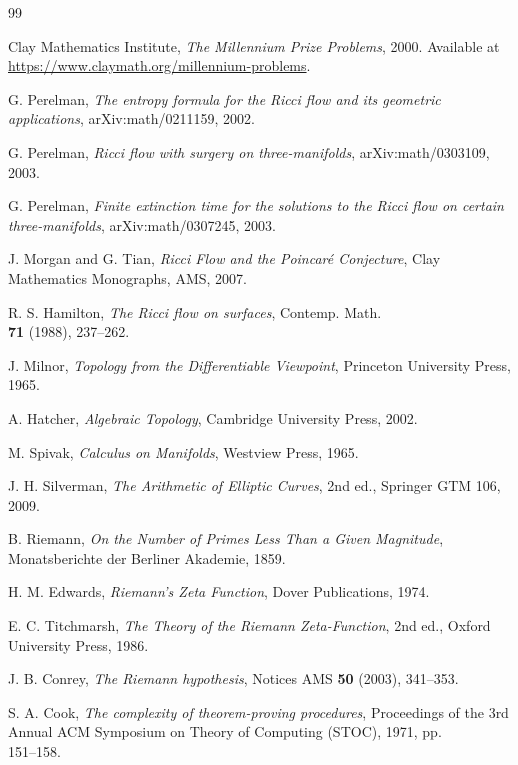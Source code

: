 \documentclass[11pt,a4paper]{book}
\theoremstyle{definition}
\begin{document}
\begin{thebibliography}{99}

 Clay Mathematics Institute, \textit{The Millennium Prize Problems}, 2000. Available at \url{https://www.claymath.org/millennium-problems}.

 G. Perelman, \textit{The entropy formula for the Ricci flow and its geometric applications}, arXiv:math/0211159, 2002.

 G. Perelman, \textit{Ricci flow with surgery on three-manifolds}, arXiv:math/0303109, 2003.

 G. Perelman, \textit{Finite extinction time for the solutions to the Ricci flow on certain three-manifolds}, arXiv:math/0307245, 2003.

 J. Morgan and G. Tian, \textit{Ricci Flow and the Poincar\'{e} Conjecture}, Clay Mathematics Monographs, AMS, 2007.

 R. S. Hamilton, \textit{The Ricci flow on surfaces}, Contemp. Math.\\ \textbf{71} (1988), 237--262.

 J. Milnor, \textit{Topology from the Differentiable Viewpoint}, Princeton University Press, 1965.

 A. Hatcher, \textit{Algebraic Topology}, Cambridge University Press, 2002.

 M. Spivak, \textit{Calculus on Manifolds}, Westview Press, 1965.

 J. H. Silverman, \textit{The Arithmetic of Elliptic Curves}, 2nd ed., Springer GTM 106, 2009.

 B. Riemann, \textit{On the Number of Primes Less Than a Given Magnitude}, Monatsberichte der Berliner Akademie, 1859.

 H. M. Edwards, \textit{Riemann's Zeta Function}, Dover Publications, 1974.

 E. C. Titchmarsh, \textit{The Theory of the Riemann Zeta-Function}, 2nd ed., Oxford University Press, 1986.

 J. B. Conrey, \textit{The Riemann hypothesis}, Notices AMS \textbf{50} (2003), 341--353.

 S. A. Cook, \textit{The complexity of theorem-proving procedures}, Proceedings of the 3rd Annual ACM Symposium on Theory of Computing (STOC), 1971, pp.\\ 151--158.


\end{thebibliography}
\end{document}
